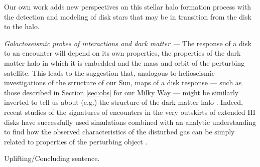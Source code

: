 \documentclass[galaxies,article,submit,moreauthors,pdftex,10pt,a4paper]{mdpi}
\begin{document}
\begin{description}
Our own work adds new perspectives on this stellar halo formation process with the detection and modeling of disk stars that may be in transition from the disk to the halo.
\item{\it Galactoseismic probes of interactions and dark matter ---}
The response of a disk to an encounter will depend on its own properties, the properties of the dark matter halo in which it is embedded and the mass and orbit of the perturbing satellite.
This leads to the suggestion that, analogous to helioseismic investigations of the structure of our Sun, maps of a disk response --- such as those described in Section \ref{sec:obs} for our Milky Way --- might be similarly inverted to tell us about (e.g.) the structure of the dark matter halo
\cite{widrow12}.
Indeed, recent studies of the signatures of encounters in the very outskirts of extended HI disks have successfully used simulations combined with an analytic understanding to find how the observed characteristics of the disturbed gas can be simply related to properties of the perturbing object \cite{chakrabarti09,chakrabarti11b,chang11}.
\end{description}

Uplifting/Concluding sentence.

\vspace{6pt}





\end{document}
